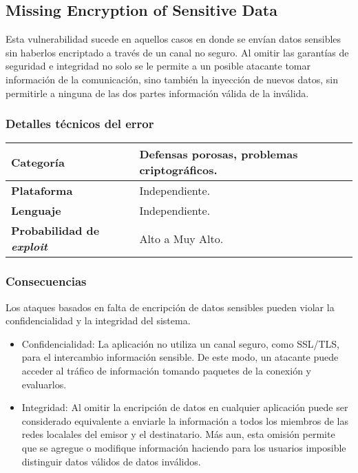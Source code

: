 \subsection{Missing Encryption of Sensitive Data}
  
Esta vulnerabilidad sucede en aquellos casos en donde se envían datos sensibles sin haberlos encriptado a través de un canal no seguro.
Al omitir las garantías de seguridad e integridad no solo se le permite a un posible atacante tomar información de la comunicación, 
sino también la inyección de nuevos datos, sin permitirle a ninguna de las dos partes información válida de la inválida.

\subsubsection{Detalles técnicos del error}
\begin{tabular}[\baselineskip]{|l|p{7cm}|}
  \hline
  \textbf{Categoría} & Defensas porosas, problemas criptográficos. \\
  \hline
  \textbf{Plataforma} & Independiente. \\
  \hline
  \textbf{Lenguaje} & Independiente. \\
  \hline
  \textbf{Probabilidad de \emph{exploit}} & Alto a Muy Alto. \\
  \hline
\end{tabular}

\subsubsection{Consecuencias}

Los ataques basados en falta de encripción de datos sensibles pueden violar la confidencialidad y la integridad del sistema.

\begin{itemize}
 \item Confidencialidad: La aplicación no utiliza un canal seguro, como SSL/TLS, para  el intercambio información sensible.
	De este modo, un atacante puede acceder al tráfico de información tomando paquetes de la conexión y evaluarlos.
 \item Integridad: Al omitir la encripción de datos en cualquier aplicación puede ser considerado equivalente a enviarle la información a todos los miembros de las redes localales del
	emisor y el destinatario. Más aun, esta omisión permite que se agregue o modifique información haciendo para los usuarios imposible distinguir datos válidos de datos inválidos.
\end{itemize}

